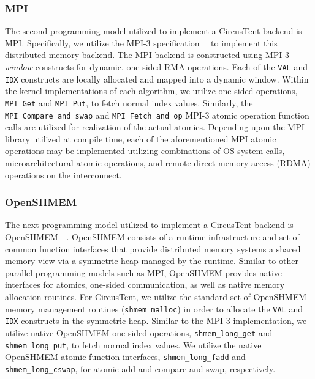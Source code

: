 \subsubsection{MPI}
\label{subsubsec:mpi}

The second programming model utilized to implement a CircusTent backend is MPI.  
Specifically, we utilize the MPI-3 specification~\cite{mpi-3.0}~\cite{10.1007/978-3-642-33518-1_1} to implement this distributed memory backend.
The MPI backend is constructed using MPI-3 \textit{window} constructs for dynamic, one-sided RMA operations.
Each of the \texttt{VAL} and \texttt{IDX} constructs are locally allocated and mapped into a dynamic window.
Within the kernel implementations of each algorithm, we utilize one sided operations, \texttt{MPI\_Get} and \texttt{MPI\_Put}, to fetch normal index values.
Similarly, the \texttt{MPI\_Compare\_and\_swap} and \texttt{MPI\_Fetch\_and\_op} MPI-3 atomic operation function calls are utilized for realization of the actual atomics.
Depending upon the MPI library utilized at compile time, each of the aforementioned MPI atomic operations may be implemented utilizing combinations of OS system calls, microarchitectural atomic 
operations, and remote direct memory access (RDMA) operations on the interconnect.  

\subsubsection{OpenSHMEM}
\label{subsubsec:openshmem}

The next programming model utilized to implement a CircusTent backend is OpenSHMEM~\cite{openshmemspec}~\cite{Poole2011}.
OpenSHMEM consists of a runtime infrastructure and set of common function interfaces that provide distributed memory systems a shared memory view via a symmetric heap managed by the runtime.  
Similar to other parallel programming models such as MPI, OpenSHMEM provides native interfaces for atomics, one-sided communication, as well as native memory allocation routines.
For CircusTent, we utilize the standard set of OpenSHMEM memory management routines (\texttt{shmem\_malloc}) in order to allocate the \texttt{VAL} and \texttt{IDX} constructs in the symmetric heap.
Similar to the MPI-3 implementation, we utilize native OpenSHMEM one-sided operations, \texttt{shmem\_long\_get} and \texttt{shmem\_long\_put}, to fetch normal index values.
We utilize the native OpenSHMEM atomic function interfaces, \texttt{shmem\_long\_fadd} and \texttt{shmem\_long\_cswap}, for atomic add and compare-and-swap, respectively.  

